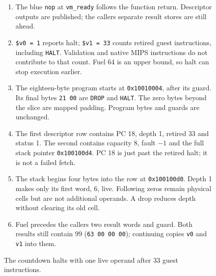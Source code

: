 \begin{figure}[htbp]
  \par\smallskip
  \begin{minipage}{\linewidth}
    \small
    \begin{enumerate}
      \setlength{\itemsep}{2pt}
            \setlength{\parsep}{0pt}
      \item The blue \texttt{nop} at \texttt{vm\_ready} follows the function return. Descriptor outputs are published; the caller\textquotesingle s separate result stores are still ahead.
      \item \texttt{\$v0 = 1} reports halt; \texttt{\$v1 = 33} counts retired guest instructions, including \texttt{HALT}. Validation and native MIPS instructions do not contribute to that count. Fuel 64 is an upper bound, so halt can stop execution earlier.
      \item The eighteen-byte program starts at \texttt{0x10010004}, after its guard. Its final bytes \texttt{21 00} are \texttt{DROP} and \texttt{HALT}. The zero bytes beyond the slice are mapped padding. Program bytes and guards are unchanged.
      \item The first descriptor row contains PC 18, depth 1, retired 33 and status 1. The second contains capacity 8, fault $-1$ and the full stack pointer \texttt{0x100100d4}. PC 18 is just past the retired halt; it is not a failed fetch.
      \item The stack begins four bytes into the row at \texttt{0x100100d0}. Depth 1 makes only its first word, 6, live. Following zeros remain physical cells but are not additional operands. A drop reduces depth without clearing its old cell.
      \item Fuel precedes the caller\textquotesingle s two result words and guard. Both results still contain 99 (\texttt{63 00 00 00}); continuing copies \texttt{v0} and \texttt{v1} into them.
    \end{enumerate}
  \end{minipage}
  \caption{The countdown halts with one live operand after 33 guest instructions.}
  \label{capture:018-tiny-bytecode-interpreter-f01}
  \label{vm-f01}
\end{figure}
\par
